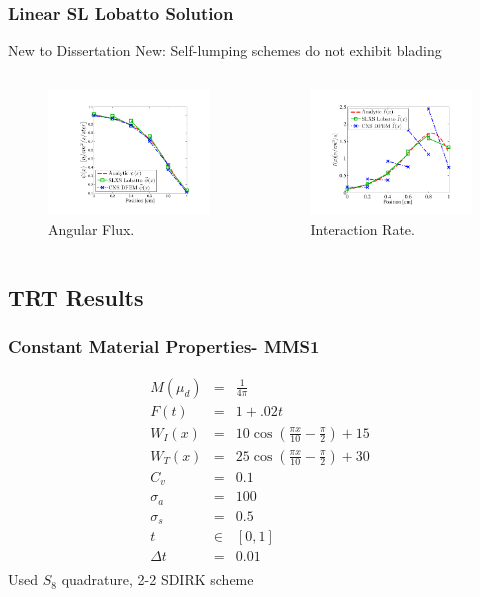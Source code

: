 \documentclass{beamer}
\newcommand{\bea}{\begin{eqnarray*}}  %
\newcommand{\eea}{\end{eqnarray*}}
\begin{document}
\begin{frame}
\frametitle{Linear SL Lobatto Solution}
\begin{block}{New to Dissertation}
New: Self-lumping schemes do not exhibit blading
\end{block}
\begin{columns}[c]
\begin{figure}
\includegraphics[width=5cm]{../chapter3_variable_xs/SLXS_Psi_Profile.pdf}
\caption{Angular Flux.}
\end{figure}
\begin{figure}
\includegraphics[width=5cm]{../chapter3_variable_xs/SLXS_I_Profile.pdf}
\caption{Interaction Rate.}
\end{figure}
\end{columns}
\end{frame}

\subsection{TRT Results}

\begin{frame}
\frametitle{Constant Material Properties- MMS1}
\bea
M(\mu_d) &=& \frac{1}{4\pi} \\
F(t) &=& 1+.02t \\
W_I(x) &=& 10 \cos\left( \frac{\pi x}{10} - \frac{\pi}{2} \right) + 15 \\
W_T(x) &=& 25 \cos\left( \frac{\pi x}{10} - \frac{\pi}{2} \right) + 30 \\
C_v &=& 0.1 \\
\sigma_a &=& 100 \\ 
\sigma_s &=& 0.5 \\
t &\in& [0,1] \\
\Delta t &=& 0.01 \\
\eea
Used $S_8$ quadrature, 2-2 SDIRK scheme
\end{frame}
\end{document}
